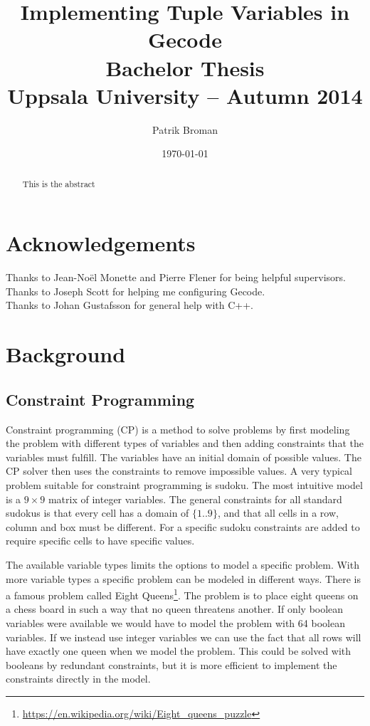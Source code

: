 \documentclass[a4paper,11pt]{article}
\title{\textbf{Implementing Tuple Variables in Gecode \\
	Bachelor Thesis \\
    Uppsala University -- Autumn 2014 \\
  }
}
\author{Patrik Broman}
\date{\today}
\begin{document}
\maketitle

\begin{abstract}
This is the abstract
\end{abstract}

\setcounter{tocdepth}{2}
\tableofcontents

\section*{Acknowledgements}
Thanks to Jean-No\"{e}l Monette and Pierre Flener for being helpful supervisors. \\
Thanks to Joseph Scott for helping me configuring Gecode. \\
Thanks to Johan Gustafsson for general help with C++. \\
\section{Background}
\subsection{Constraint Programming}

Constraint programming (CP) is a method to solve problems by first modeling the problem with different types of variables and then adding constraints that the variables must fulfill. The variables have an initial domain of possible values. The CP solver then uses the constraints to remove impossible values. A very typical problem suitable for constraint programming is sudoku. The most intuitive model is a $9\times9$ matrix of integer variables. The general constraints for all standard sudokus is that every cell has a domain of $\{1..9\}$, and that all cells in a row, column and box must be different. For a specific sudoku constraints are added to require specific cells to have specific values.

The available variable types limits the options to model a specific problem. With more variable types a specific problem can be modeled in different ways. There is a famous problem called Eight Queens\footnote{\url{https://en.wikipedia.org/wiki/Eight_queens_puzzle}}. The problem is to place eight queens on a chess board in such a way that no queen threatens another. If only boolean variables were available we would have to model the problem with 64 boolean variables. If we instead use integer variables we can use the fact that all rows will have exactly one queen when we model the problem. This could be solved with booleans by redundant constraints, but it is more efficient to implement the constraints directly in the model.
\end{document}
